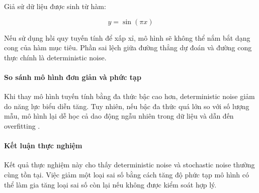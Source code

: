 Giả sử dữ liệu được sinh từ hàm:

\[
y = \sin(\pi x)
\]

Nếu sử dụng hồi quy tuyến tính để xấp xỉ, mô hình sẽ không thể nắm bắt dạng cong của hàm mục tiêu. Phần sai lệch giữa đường thẳng dự đoán và đường cong thực chính là deterministic noise.

\paragraph{So sánh mô hình đơn giản và phức tạp}

Khi thay mô hình tuyến tính bằng đa thức bậc cao hơn, deterministic noise giảm do năng lực biểu diễn tăng. Tuy nhiên, nếu bậc đa thức quá lớn so với số lượng mẫu, mô hình lại dễ học cả dao động ngẫu nhiên trong dữ liệu và dẫn đến overfitting \cite{Bishop2006}.

\paragraph{Kết luận thực nghiệm}

Kết quả thực nghiệm này cho thấy deterministic noise và stochastic noise thường cùng tồn tại. Việc giảm một loại sai số bằng cách tăng độ phức tạp mô hình có thể làm gia tăng loại sai số còn lại nếu không được kiểm soát hợp lý.




